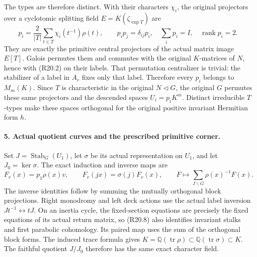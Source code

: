 The types are therefore distinct. With their characters
\(\chi_i\), the original projectors over a cyclotomic
splitting field \(E=K(\zeta_{\exp T})\) are
\[
 p_i=\frac2{|T|}\sum_{t\in T}\chi_i(t^{-1})\rho(t),
 \qquad p_ip_j=\delta_{ij}p_i,\quad\sum_i p_i=I,
 \quad\operatorname{rank}p_i=2.                          \tag{R20.7}
\]
They are exactly the primitive central projectors of
the actual matrix image \(E[T]\). Galois permutes
them and commutes with the original \(K\)-matrices
of \(N\), hence with (R20.2) on their labels.
That permutation centralizer is trivial: the stabilizer
of a label in \(A_r\) fixes only that label.
Therefore every \(p_i\) belongs to \(M_m(K)\).
Since \(T\) is characteristic in the original
\(N\triangleleft G\), the original \(G\) permutes
these same projectors and the descended spaces
\(U_i=p_iK^m\). Distinct irreducible \(T\)-types
make these spaces orthogonal for the original positive
invariant Hermitian form \(h\).

\paragraph{5. Actual quotient curves and the prescribed primitive corner.}
Set \(J=\operatorname{Stab}_G(U_1)\), let
\(\sigma\) be its actual representation on \(U_1\),
and let \(J_0=\ker\sigma\). The exact induction
and inverse maps are
\[
 F_v(x)=p_1\rho(x)v,\qquad F_v(jx)=\sigma(j)F_v(x),
 \qquad F\longmapsto\sum_{J\backslash G}\rho(x)^{-1}F(x).
                                                               \tag{R20.8}
\]
The inverse identities follow by summing the mutually
orthogonal block projections. Right monodromy and
left deck actions use the actual label inversion
\(Jt^{-1}\leftrightarrow tJ\). On an inertia cycle,
the fixed-section equations are precisely the fixed
equations of its actual return matrix, so (R20.8)
also identifies invariant stalks and first parabolic
cohomology. Its paired map uses the sum of the
orthogonal block forms. The induced trace formula
gives \(K=\mathbb Q(\operatorname{tr}\rho)\subset
\mathbb Q(\operatorname{tr}\sigma)\subset K\).
The faithful quotient \(J/J_0\) therefore has the
same exact character field.

